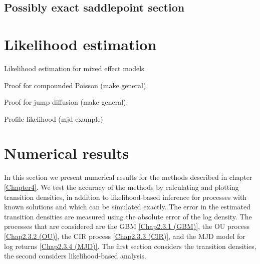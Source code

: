 \subsection{Possibly exact saddlepoint section}



\section{Likelihood estimation}

Likelihood estimation for mixed effect models. 

Proof for compounded Poisson (make general).

Proof for jump diffusion (make general).

Profile likelihood (mjd example)

\section{Numerical results}
\label{sec::numerical_results}

In this section we present numerical results for the methods described in chapter \ref{Chapter4}.
We test the accuracy of the methods by calculating and plotting transition densities, in addition to likelihood-based inference for processes with known solutions and which can be simulated exactly.
The error in the estimated transition densities are measured using the absolute error of the log density.
The processes that are considered are the GBM \eqref{Chap2.3.1 (GBM)}, the OU process \eqref{Chap2.3.2 (OU)}, the CIR process \eqref{Chap2.3.3 (CIR)}, and the MJD model for log returns \eqref{Chap2.3.4 (MJD)}.
The first section considers the transition densities, the second considers likelihood-based analysis.



